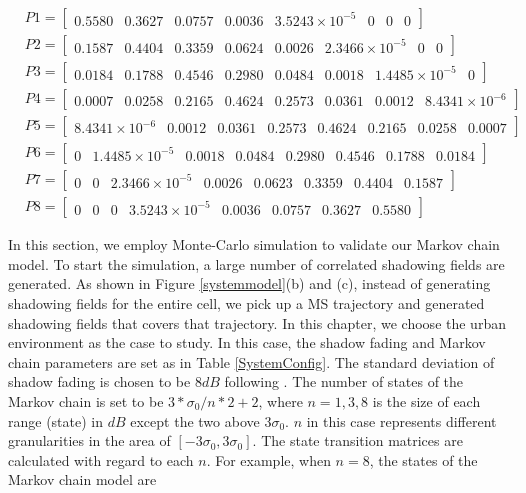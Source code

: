 \begin{equation}
\begin{split}
& P1=\begin{bmatrix}
0.5580 & 0.3627 & 0.0757 & 0.0036 & 3.5243\times10^{-5} & 0 & 0 & 0
\end{bmatrix}\\
& P2 = \begin{bmatrix}
0.1587 & 0.4404 & 0.3359 & 0.0624 & 0.0026 & 2.3466\times10^{-5} & 0 & 0 
\end{bmatrix}\\
& P3 = \begin{bmatrix}
0.0184 & 0.1788 & 0.4546 & 0.2980 & 0.0484 & 0.0018 & 1.4485\times10^{-5} & 0
\end{bmatrix}\\
& P4 = \begin{bmatrix}
0.0007 & 0.0258 & 0.2165 & 0.4624 & 0.2573 & 0.0361 & 0.0012 & 8.4341\times10^{-6}
\end{bmatrix}\\
& P5 = \begin{bmatrix}
8.4341\times10^{-6} & 0.0012 & 0.0361 & 0.2573 & 0.4624 & 0.2165 & 0.0258 & 0.0007
\end{bmatrix}\\
& P6 = \begin{bmatrix}
0 & 1.4485\times10^{-5} & 0.0018 & 0.0484 & 0.2980 & 0.4546 & 0.1788 & 0.0184
\end{bmatrix}\\
& P7 = \begin{bmatrix}
0 & 0 & 2.3466\times10^{-5} & 0.0026 & 0.0623 & 0.3359 & 0.4404 & 0.1587
\end{bmatrix}\\
& P8 = \begin{bmatrix}
0 & 0 & 0 & 3.5243\times10^{-5} & 0.0036 & 0.0757 & 0.3627 & 0.5580
\end{bmatrix}
\end{split}
\label{smallmatrix}
\end{equation}
\par In this section, we employ Monte-Carlo simulation to validate our Markov chain model. To start the simulation, a large number of correlated shadowing fields are generated. As shown in Figure \ref{systemmodel}(b) and (c), instead of generating shadowing fields for the entire cell, we pick up a MS trajectory and generated shadowing fields that covers that trajectory. In this chapter, we choose the urban environment as the case to study. In this case, the shadow fading and Markov chain parameters are set as in Table \ref{SystemConfig}. The standard deviation of shadow fading is chosen to be $8dB$ following \cite{szyszkowicz2010feasibility}. The number of states of the Markov chain is set to be $3*\sigma_{0}/n*2+2$, where $n=1,3,8$ is the size of each range (state) in $dB$ except the two above $3\sigma_{0}$. $n$ in this case represents different granularities in the area of $[-3\sigma_{0},3\sigma_{0}]$. The state transition matrices are calculated with regard to each $n$. For example, when $n=8$, the states of the Markov chain model are
